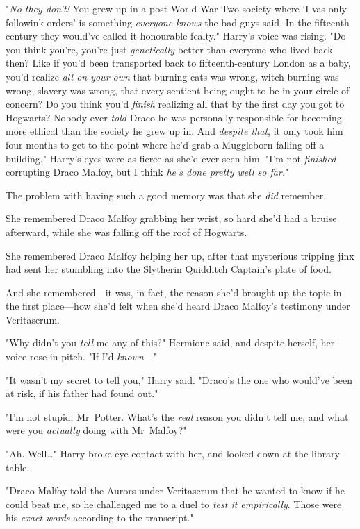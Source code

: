 "\emph{No they don’t!} You grew up in a post-World-War-Two society where ‘I vas
only followink orders’ is something \emph{everyone knows} the bad guys said. In
the fifteenth century they would’ve called it honourable fealty." Harry’s voice
was rising. "Do you think you’re, you’re just \emph{genetically} better than
everyone who lived back then? Like if you’d been transported back to
fifteenth-century London as a baby, you’d realize \emph{all on your own} that
burning cats was wrong, witch-burning was wrong, slavery was wrong, that every
sentient being ought to be in your circle of concern? Do you think you’d
\emph{finish} realizing all that by the first day you got to Hogwarts? Nobody
ever \emph{told} Draco he was personally responsible for becoming more ethical
than the society he grew up in. And \emph{despite that}, it only took him four
months to get to the point where he’d grab a Muggleborn falling off a
building." Harry’s eyes were as fierce as she’d ever seen him. "I’m not
\emph{finished} corrupting Draco Malfoy, but I think \emph{he’s done pretty
well so far.}"

The problem with having such a good memory was that she \emph{did} remember.

She remembered Draco Malfoy grabbing her wrist, so hard she’d had a bruise
afterward, while she was falling off the roof of Hogwarts.

She remembered Draco Malfoy helping her up, after that mysterious tripping jinx
had sent her stumbling into the Slytherin Quidditch Captain’s plate of food.

And she remembered—it was, in fact, the reason she’d brought up the topic in
the first place—how she’d felt when she’d heard Draco Malfoy’s testimony
under Veritaserum.

"Why didn’t you \emph{tell} me any of this?" Hermione said, and despite
herself, her voice rose in pitch. "If I’d \emph{known}—"

"It wasn’t my secret to tell you," Harry said. "Draco’s the one who would’ve
been at risk, if his father had found out."

"I’m not stupid, Mr~Potter. What’s the \emph{real} reason you didn’t tell me,
and what were you \emph{actually} doing with Mr~Malfoy?"

"Ah. Well…" Harry broke eye contact with her, and looked down at the
library table.

"Draco Malfoy told the Aurors under Veritaserum that he wanted to know if he
could beat me, so he challenged me to a duel to \emph{test it empirically}.
Those were his \emph{exact words} according to the transcript."

